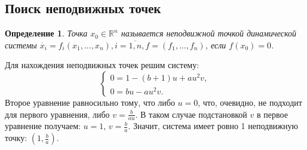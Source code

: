 \documentclass[12pt]{article}
\newtheorem{definition}{Определение}
\begin{document}
\subsection{Поиск неподвижных точек}
\begin{definition}
    Точка $x_0 \in \mathbb{R}^n$ называется неподвижной точкой динамической системы $\dot{x_i} = f_i(x_1, ..., x_n), i = \overline{1,n}, f = (f_1, ..., f_n)$, если $f(x_0) = 0$.
\end{definition}
Для нахождения неподвижных точек решим систему:
\begin{equation}
    \begin{cases}
        0 = 1 - (b+1)u + au^2v,\\
        0 = bu - au^2v.
    \end{cases}
\end{equation}
Второе уравнение равносильно тому, что либо $u=0$, что, очевидно, не подходит для первого уравнения, либо $v = \frac{b}{au}$. В таком случае подстановкой $v$ в первое уравнение получаем: $u = 1$, $v = \frac{b}{a}$. Значит, система имеет ровно 1 неподвижную точку: $\left(1, \frac{b}{a}\right)$.
\end{document}
